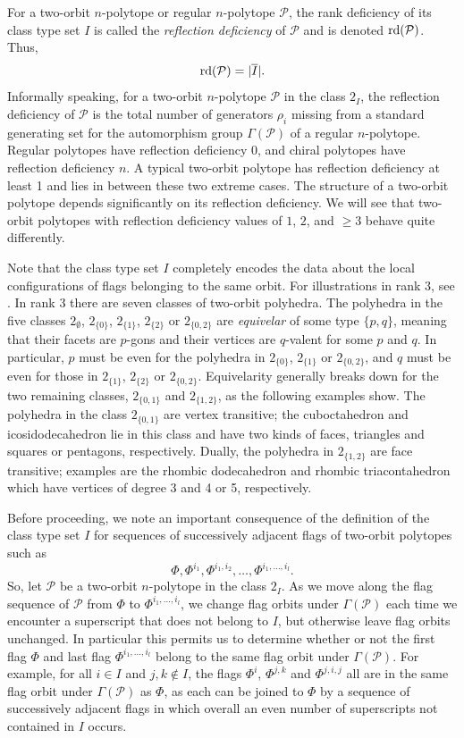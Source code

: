 \documentclass[12pt]{article}
\renewcommand{\bar}{\overline}
\renewcommand{\>}{\rangle}
\renewcommand{\geq}{\geqslant}
\theoremstyle{definition}\newtheorem{definition}{Definition}[section]
\begin{document}
For a two-orbit $n$-polytope or regular $n$-polytope $\mathcal{P}$, the rank deficiency of its class type set $I$ is called the {\it reflection deficiency} of $\mathcal{P}$ and is denoted ${\rm rd}(\mathcal{P})$. Thus,
\[ {\rm rd}(\mathcal{P}) =|\bar{I}|.\]
Informally speaking, for a two-orbit $n$-polytope $\mathcal{P}$ in the class $2_I$, the reflection deficiency of $\mathcal{P}$ is the total number of generators $\rho_i$ missing from a standard generating set for the automorphism group $\Gamma(\mathcal{P})$ of a regular $n$-polytope. Regular polytopes have reflection deficiency $0$, and chiral polytopes have reflection deficiency $n$. A typical two-orbit polytope has reflection deficiency at least 1 and lies in between these two extreme cases. The structure of a two-orbit polytope depends significantly on its reflection deficiency. We will see that two-orbit polytopes with reflection deficiency values of $1$, $2$, and $\geq 3$ behave quite differently. 

Note that the class type set $I$ completely encodes the data about the local configurations of flags belonging to the same orbit. For illustrations in rank 3, see \cite[Figures 1,\,2]{H2010}. In rank 3 there are seven classes of two-orbit polyhedra. The polyhedra in the five classes $2_\emptyset$, $2_{\{0\}}$, $2_{\{1\}}$, $2_{\{2\}}$ or $2_{\{0,2\}}$ are {\em equivelar\/} of some type $\{p,q\}$, meaning that their facets are $p$-gons and their vertices are $q$-valent for some $p$ and $q$. In particular, $p$ must be even for the polyhedra in $2_{\{0\}}$, $2_{\{1\}}$ or $2_{\{0,2\}}$, and $q$ must be even for those in  $2_{\{1\}}$, $2_{\{2\}}$ or $2_{\{0,2\}}$. Equivelarity generally breaks down for the two remaining classes, $2_{\{0,1\}}$ and $2_{\{1,2\}}$, as the following examples show. The polyhedra in the class $2_{\{0,1\}}$ are vertex transitive; the cuboctahedron and icosidodecahedron lie in this class and have two kinds of faces, triangles and squares or pentagons, respectively. Dually, the polyhedra in $2_{\{1,2\}}$ are face transitive; examples are the rhombic dodecahedron and rhombic triacontahedron which have vertices of degree 3 and 4 or 5, respectively.
\smallskip

Before proceeding, we note an important consequence of the definition of the class type set $I$ for sequences of successively adjacent flags of two-orbit polytopes such as 
\[\Phi,\Phi^{i_1},\Phi^{i_{1},i_{2}}, \ldots, \Phi^{i_{1},\ldots,i_{l}}.\]
So, let $\mathcal{P}$ be a two-orbit $n$-polytope in the class $2_I$.  As we move along the flag sequence of $\mathcal{P}$ from $\Phi$ to $\Phi^{i_{1},\ldots,i_{l}}$, we change flag orbits under $\Gamma(\mathcal{P})$ each time we encounter a superscript that does not belong to $I$, but otherwise leave flag orbits unchanged. In particular this permits us to determine whether or not the first flag $\Phi$ and last flag $\Phi^{i_{1},\ldots,i_{l}}$ belong to the same flag orbit under $\Gamma(\mathcal{P})$. For example, for all $i \in I$ and $j,k \notin I$, the flags $\Phi^i$, $\Phi^{j,k}$ and $\Phi^{j,i,j}$ all are in the same flag orbit under $\Gamma(\mathcal{P})$ as $\Phi$, as each can be joined to $\Phi$ by a sequence of successively adjacent flags in which overall an even number of superscripts not contained in $I$ occurs. 
\end{document}
